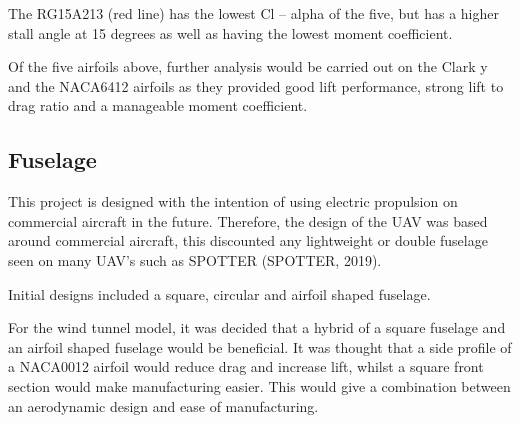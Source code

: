 \documentclass[../../main.tex]{subfiles}
\begin{document}
The RG15A213 (red line) has the lowest Cl – alpha of the five, but has a higher stall angle at 15 degrees as well as having the lowest moment coefficient.

Of the five airfoils above, further analysis would be carried out on the Clark y and the NACA6412 airfoils as they provided good lift performance, strong lift to drag ratio and a manageable moment coefficient.


\subsection{Fuselage} \label{sec:design-process:initial-designs:fuselage}

This project is designed with the intention of using electric propulsion on commercial aircraft in the future.
Therefore, the design of the UAV was based around commercial aircraft, this discounted any lightweight or double fuselage seen on many UAV’s such as SPOTTER (SPOTTER, 2019). 

Initial designs included a square, circular and airfoil shaped fuselage.



For the wind tunnel model, it was decided that a hybrid of a square fuselage and an airfoil shaped fuselage would be beneficial.
It was thought that a side profile of a NACA0012 airfoil would reduce drag and increase lift, whilst a square front section would make manufacturing easier.
This would give a combination between an aerodynamic design and ease of manufacturing.  
\end{document}
